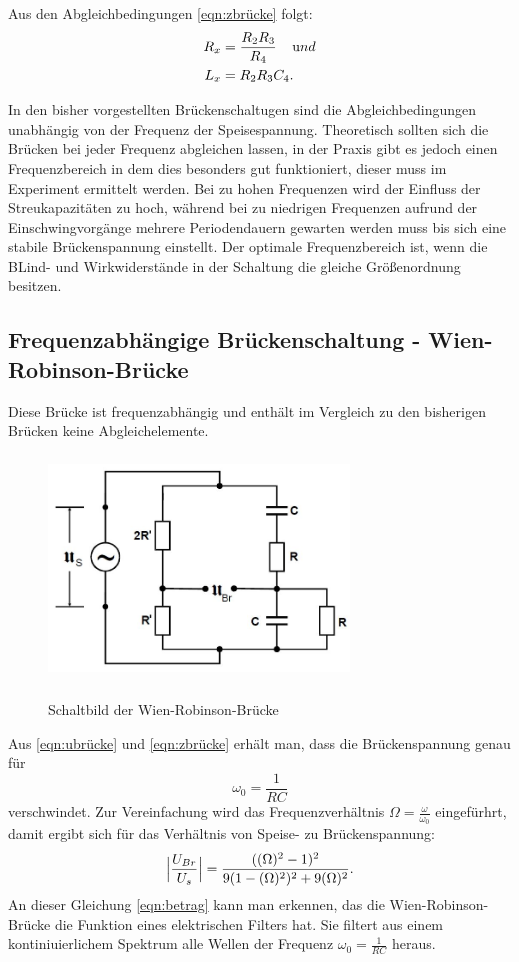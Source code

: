 Aus den Abgleichbedingungen \ref{eqn:zbrücke} folgt:
\begin{align}
  R_{x} &=\frac{R_{2} R_{3}}{R_{4}} \;\;\;\; \text und \\
  L_{x} &=R_{2}R_{3}C_{4}.
\end{align}

\noindent In den bisher vorgestellten Brückenschaltugen sind die Abgleichbedingungen
unabhängig von der Frequenz der Speisespannung. Theoretisch sollten sich die Brücken bei jeder
Frequenz abgleichen lassen, in der Praxis gibt es jedoch einen Frequenzbereich in dem
dies besonders gut funktioniert, dieser muss im Experiment ermittelt werden.
Bei zu hohen Frequenzen wird der Einfluss der Streukapazitäten zu hoch, während
bei zu niedrigen Frequenzen aufrund der Einschwingvorgänge mehrere Periodendauern
gewarten werden muss bis sich eine stabile Brückenspannung einstellt.
Der optimale Frequenzbereich ist, wenn die BLind- und Wirkwiderstände in der
Schaltung die gleiche Größenordnung besitzen.

\subsection{Frequenzabhängige Brückenschaltung - Wien-Robinson-Brücke}
Diese Brücke ist frequenzabhängig und enthält im Vergleich zu den bisherigen Brücken
keine Abgleichelemente.
\begin{figure}[H]
  \centering
  \includegraphics[width=8cm,height=6cm]{wien.JPG}
  \caption{Schaltbild der Wien-Robinson-Brücke}
  \label{fig:wien}
  \cite{skript}
\end{figure}

Aus \ref{eqn:ubrücke} und \ref{eqn:zbrücke} erhält man, dass die Brückenspannung genau für
\begin{equation*}
  \omega_{0}=\frac{1}{RC}
  \label{eqn:omega}
\end{equation*}
verschwindet.
Zur Vereinfachung wird das Frequenzverhältnis $\Omega=\frac{\omega}{\omega_{0}}$
eingefürhrt, damit ergibt sich für das Verhältnis von Speise- zu Brückenspannung:
\begin{equation}
  \Bigl|\frac{U_{Br}}{U_{s}}\Bigr|=\frac{((\Omega)^2-1)^2}{9(1-(\Omega)^2)^2+9(\Omega)^2}.
  \label{eqn:betrag}
\end{equation}
An dieser Gleichung \ref{eqn:betrag} kann man erkennen, das die Wien-Robinson-Brücke
die Funktion eines elektrischen Filters hat. Sie filtert aus einem kontiniuierlichem
Spektrum alle Wellen der Frequenz $\omega_{0}=\frac{1}{RC}$ heraus.

